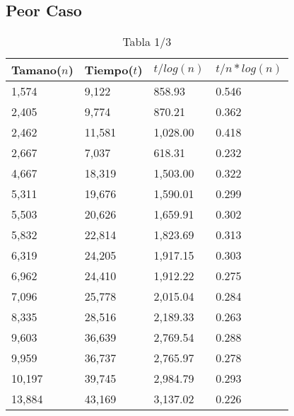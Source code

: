 \subsection{Peor Caso}
\begin{table}[H]
\parbox{0.3\textwidth}{
  \begin{tabular}{| l | l | l |l |}
    \hline
    Tamano($n$) & Tiempo($t$) & $t / log(n)$ & $t / n*log(n)$ \\ \hline
1,574	&	9,122	&	858.93	&	0.546	\\ \hline
2,405	&	9,774	&	870.21	&	0.362	\\ \hline
2,462	&	11,581	&	1,028.00	&	0.418	\\ \hline
2,667	&	7,037	&	618.31	&	0.232	\\ \hline
4,667	&	18,319	&	1,503.00	&	0.322	\\ \hline
5,311	&	19,676	&	1,590.01	&	0.299	\\ \hline
5,503	&	20,626	&	1,659.91	&	0.302	\\ \hline
5,832	&	22,814	&	1,823.69	&	0.313	\\ \hline
6,319	&	24,205	&	1,917.15	&	0.303	\\ \hline
6,962	&	24,410	&	1,912.22	&	0.275	\\ \hline
7,096	&	25,778	&	2,015.04	&	0.284	\\ \hline
8,335	&	28,516	&	2,189.33	&	0.263	\\ \hline
9,603	&	36,639	&	2,769.54	&	0.288	\\ \hline
9,959	&	36,737	&	2,765.97	&	0.278	\\ \hline
10,197	&	39,745	&	2,984.79	&	0.293	\\ \hline
13,884	&	43,169	&	3,137.02	&	0.226	\\ \hline

  \end{tabular}
   \caption*{Tabla 1/3}
}
\end{table}
